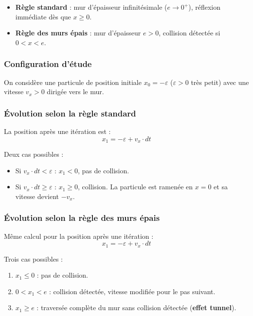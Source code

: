 \documentclass[12pt,a4paper]{report}
\begin{document}
\begin{itemize}
    \item \textbf{Règle standard} : mur d'épaisseur infinitésimale ($e \to 0^+$), réflexion immédiate dès que $x \geq 0$.
    \item \textbf{Règle des murs épais} : mur d'épaisseur $e > 0$, collision détectée si $0 < x < e$.
\end{itemize}

\subsubsection{Configuration d'étude}

On considère une particule de position initiale $x_0 = -\varepsilon$ ($\varepsilon > 0$ très petit) avec une vitesse $v_x > 0$ dirigée vers le mur.

\subsubsection{Évolution selon la règle standard}

La position après une itération est :
\[
x_1 = -\varepsilon + v_x \cdot dt
\]

Deux cas possibles :
\begin{itemize}
    \item Si $v_x \cdot dt < \varepsilon$ : $x_1 < 0$, pas de collision.
    \item Si $v_x \cdot dt \geq \varepsilon$ : $x_1 \geq 0$, collision. La particule est ramenée en $x = 0$ et sa vitesse devient $-v_x$.
\end{itemize}

\subsubsection{Évolution selon la règle des murs épais}

Même calcul pour la position après une itération :
\[
x_1 = -\varepsilon + v_x \cdot dt
\]

Trois cas possibles :
\begin{enumerate}
    \item $x_1 \leq 0$ : pas de collision.
    \item $0 < x_1 < e$ : collision détectée, vitesse modifiée pour le pas suivant.
    \item $x_1 \geq e$ : traversée complète du mur sans collision détectée (\textbf{effet tunnel}).
\end{enumerate}
\end{document}
